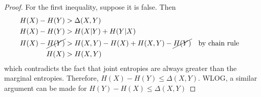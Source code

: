 \documentclass[
  coursecode={MTHE 474},
  assignmentname={Homework \homeworknumber},
  studentnumber=20053722,
  name={Bryan Hoang}
]{
  ltxanswer%
}
\begin{document}
\begin{questions}
\begin{solution}
\begin{parts}
        \part{}
        \begin{proof}
          For the first inequality, suppose it is false. Then
          \begin{align*}
            H(X) - H(Y)          &> \Delta(X,Y)                                                    \\
            H(X) - H(Y)          &> H(X|Y) + H(Y|X)                                                \\
            H(X) - \cancel{H(Y)} &> H(X,Y) - H(X) + H(X,Y) - \cancel{H(Y)} & &\text{by chain rule} \\
            H(X)                 &> H(X,Y)
          \end{align*}
          which contradicts the fact that joint entropies are always greater than the marginal entropies. Therefore, \(H(X) - H(Y) \le \Delta(X,Y)\). WLOG, a similar argument can be made for \(H(Y) - H(X) \le \Delta(X,Y)\)


\end{proof}
\end{parts}
\end{solution}
\end{questions}
\end{document}
